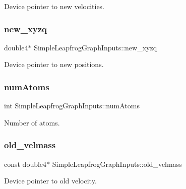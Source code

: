 Device pointer to new velocities. 

\hypertarget{structSimpleLeapfrogGraphInputs_a769f1661c0f9d43ffa98066b106049ab}{}\label{structSimpleLeapfrogGraphInputs_a769f1661c0f9d43ffa98066b106049ab} 
\subsubsection{\texorpdfstring{new\+\_\+xyzq}{new\_xyzq}}
{\footnotesize\ttfamily double4$\ast$ Simple\+Leapfrog\+Graph\+Inputs\+::new\+\_\+xyzq}



Device pointer to new positions. 

\hypertarget{structSimpleLeapfrogGraphInputs_af774c2d3b4033330bb43cbbe3398059f}{}\label{structSimpleLeapfrogGraphInputs_af774c2d3b4033330bb43cbbe3398059f} 
\subsubsection{\texorpdfstring{num\+Atoms}{numAtoms}}
{\footnotesize\ttfamily int Simple\+Leapfrog\+Graph\+Inputs\+::num\+Atoms}



Number of atoms. 

\hypertarget{structSimpleLeapfrogGraphInputs_a0bc70243226e08c936bb36c5dcaa37cc}{}\label{structSimpleLeapfrogGraphInputs_a0bc70243226e08c936bb36c5dcaa37cc} 
\subsubsection{\texorpdfstring{old\+\_\+velmass}{old\_velmass}}
{\footnotesize\ttfamily const double4$\ast$ Simple\+Leapfrog\+Graph\+Inputs\+::old\+\_\+velmass}



Device pointer to old velocity. 

\hypertarget{structSimpleLeapfrogGraphInputs_a01fc1ca37ad0127b87feb3d757d6f41c}{}\label{structSimpleLeapfrogGraphInputs_a01fc1ca37ad0127b87feb3d757d6f41c} 
